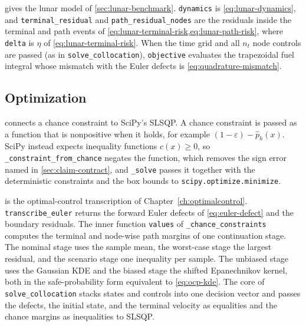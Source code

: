 
 gives the lunar model of \cref{sec:lunar-benchmark}.
\texttt{dynamics} is \cref{eq:lunar-dynamics}, and \texttt{terminal\_residual}
and \texttt{path\_residual\_nodes} are the residuals inside the terminal and
path events of \cref{eq:lunar-terminal-risk,eq:lunar-path-risk}, where
\texttt{delta} is $\eta$ of \cref{eq:lunar-terminal-risk}. When the time grid and all $n_t$ node controls are passed (as in
\texttt{solve\_collocation}), \texttt{objective} evaluates the trapezoidal fuel
integral whose mismatch with the Euler defects is \cref{eq:quadrature-mismatch}.


\subsection{Optimization}

 connects a chance constraint to SciPy's SLSQP. A
chance constraint is passed as a function that is nonpositive when it holds,
for example $(1-\varepsilon)-\hat p_h(x)$. SciPy instead expects inequality
functions $c(x)\geq0$, so \texttt{\_constraint\_from\_chance} negates the
function, which removes the sign error named in \cref{sec:claim-contract}, and \texttt{\_solve} passes it together with the deterministic
constraints and the box bounds to \texttt{scipy.optimize.minimize}.


 is the optimal-control transcription of
Chapter~\ref{ch:optimalcontrol}. \texttt{transcribe\_euler} returns the forward Euler
defects of \cref{eq:euler-defect} and the boundary residuals. The inner function
\texttt{values} of \texttt{\_chance\_constraints} computes the terminal and
node-wise path margins of one continuation stage. The nominal stage uses the
sample mean, the worst-case stage the largest residual, and the scenario stage
one inequality per sample. The unbiased stage uses the Gaussian KDE and the
biased stage the shifted Epanechnikov kernel, both in the safe-probability form
equivalent to \cref{eq:ocp-kde}. The core of \texttt{solve\_collocation}
stacks states and controls into one decision vector and passes the defects, the initial state, and the terminal velocity as
equalities and the chance margins as inequalities to SLSQP.


